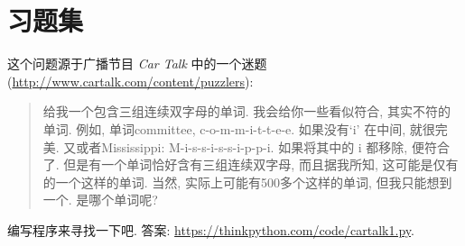 \documentclass[10pt]{book}
\begin{document}
\section{习题集}

\begin{exercise}


这个问题源于广播节目 {\em Car Talk} 中的一个迷题
(\url{http://www.cartalk.com/content/puzzlers}):

\begin{quote}
给我一个包含三组连续双字母的单词. 
我会给你一些看似符合, 其实不符的单词. 
例如, 单词committee,  c-o-m-m-i-t-t-e-e. 
如果没有`i' 在中间, 就很完美. 
又或者Mississippi: M-i-s-s-i-s-s-i-p-p-i.
如果将其中的 i 都移除, 便符合了. 
但是有一个单词恰好含有三组连续双字母, 而且据我所知, 
这可能是仅有的一个这样的单词. 
当然, 实际上可能有500多个这样的单词, 但我只能想到一个. 
是哪个单词呢?
\end{quote}

编写程序来寻找一下吧. 
答案: \url{https://thinkpython.com/code/cartalk1.py}.

\end{exercise}
\end{document}
